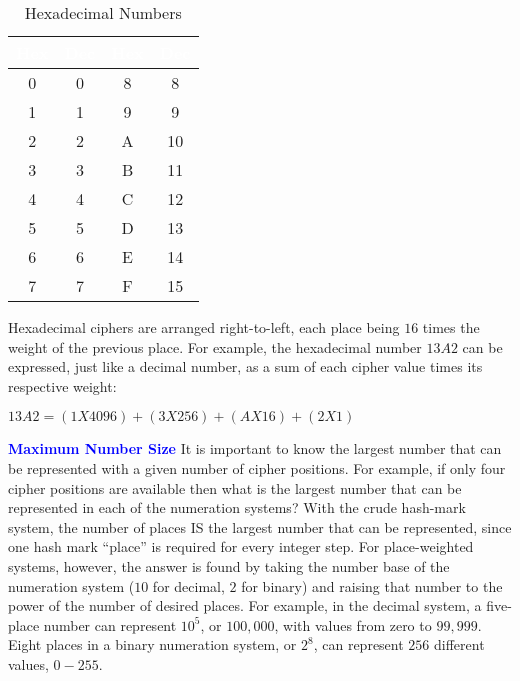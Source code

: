 \begin{table}[H]
  \sffamily
  \newcommand{\head}[1]{\textcolor{white}{\textbf{#1}}}  
  \begin{center}
    \begin{tabular}{|cc|cc|} 
      \hline
      \rowcolor{black!75}
      \head{Hex} & \head{Dec} & \head{Hex} & \head{Dec} \\ 
      \hline
      0 & 0 & 8 & 8  \\ 
      1 & 1 & 9 & 9  \\ 
      2 & 2 & A & 10 \\ 
      3 & 3 & B & 11 \\ 
      4 & 4 & C & 12 \\ 
      5 & 5 & D & 13 \\ 
      6 & 6 & E & 14 \\ 
      7 & 7 & F & 15 \\ 
      \hline
    \end{tabular} 
  \end{center}
  \caption{Hexadecimal Numbers}
  \label{MF:tab:hexadecimal_numbers}  
\end{table}

Hexadecimal ciphers are arranged right-to-left, each place being $ 16 $ times the weight of the previous place. For example, the hexadecimal number $ 13A2 $ can be expressed, just like a decimal number, as a sum of each cipher value times its respective weight:

\begin{center}
  $13A2 = (1 X 4096) + (3 X 256) + (A X 16) + (2 X 1)$
\end{center}

\begin{tcolorbox}[colback=blue!5!white,colframe=blue!75!black]
  \textcolor{blue}{\textbf{Maximum Number Size}}
  \tcblower
  It is important to know the largest number that can be represented with a given number of cipher positions. For example, if only four cipher positions are available then what is the largest number that can be represented in each of the numeration systems? With the crude hash-mark system, the number of places IS the largest number that can be represented, since one hash mark ``place'' is required for every integer step. For place-weighted systems, however, the answer is found by taking the number base of the numeration system ($ 10 $ for decimal, $ 2 $ for binary) and raising that number to the power of the number of desired places. For example, in the decimal system, a five-place number can represent $ 10^{5} $, or $ 100,000 $, with values from zero to $ 99,999 $. Eight places in a binary numeration system, or $ 2^{8} $, can represent $ 256 $ different values, $ 0 - 255 $.
\end{tcolorbox}

